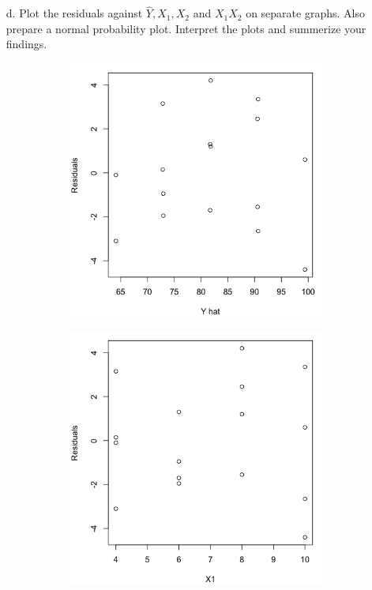 \documentclass[10pt]{report}
\begin{document}
\begin{enumerate}
	\item [d.]
	Plot the residuals against $\hat{Y}, X_1, X_2$ and $X_1 X_2$ on separate graphs. Also prepare a normal probability plot. Interpret the plots and summerize your findings.
	\begin{figure}[H]
		\centering
		\begin{subfigure}[b]{.4\linewidth}
			\includegraphics[width=\linewidth]{p1/5d1.png}
		\end{subfigure}
		\begin{subfigure}[b]{.4\linewidth}
			\includegraphics[width=\linewidth]{p1/5d2.png} 

\end{subfigure}
\end{figure}
\end{enumerate}
\end{document}
